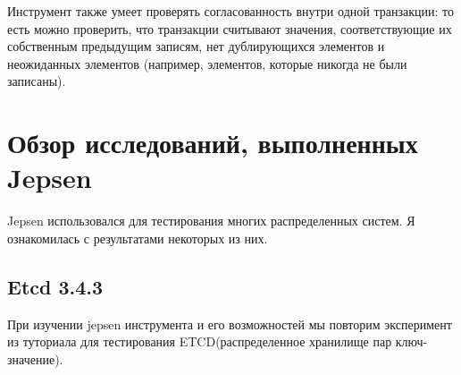 \documentclass[12pt,  openany]{book}
\begin{document}
\par Инструмент также умеет проверять согласованность внутри одной транзакции: то есть можно проверить, что транзакции считывают значения, соответствующие их собственным предыдущим записям, нет дублирующихся элементов и неожиданных элементов (например, элементов, которые никогда не были записаны).

\section{Обзор исследований, выполненных Jepsen}
Jepsen использовался для тестирования многих распределенных систем. 
Я ознакомилась с результатами некоторых из них.
\subsection{Etcd 3.4.3 \cite{etcdAnalyses} \cite{etcdTutorial}}
При изучении jepsen инструмента и его возможностей мы повторим эксперимент из туториала для тестирования ETCD(распределенное хранилище пар ключ-значение).
\end{document}
